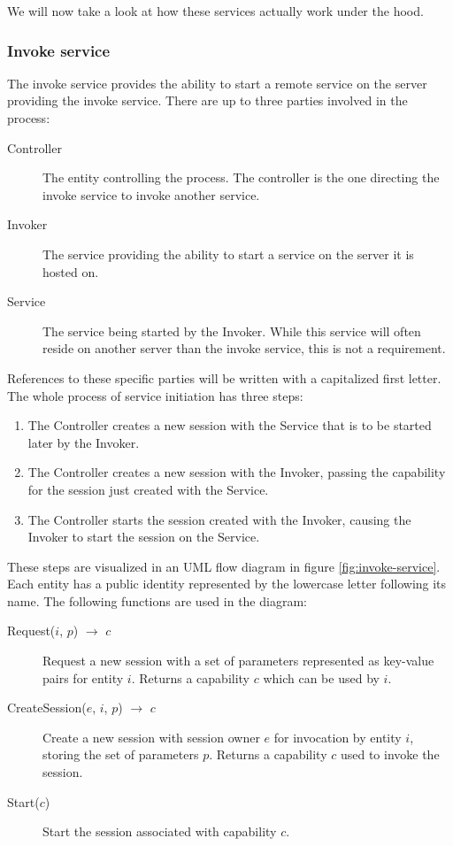 We will now take a look at how these services actually work under the hood.

\subsubsection{Invoke service}
\label{sec:invoke-service}

The invoke service provides the ability to start a remote service on the server providing the invoke service.
There are up to three parties involved in the process:
\begin{description}
    \item[Controller]
        The entity controlling the process.
        The controller is the one directing the invoke service to invoke another service.
    \item[Invoker]
        The service providing the ability to start a service on the server it is hosted on.
    \item[Service]
        The service being started by the Invoker.
        While this service will often reside on another server than the invoke service, this is not a requirement.
\end{description}

References to these specific parties will be written with a capitalized first letter.
The whole process of service initiation has three steps:
\begin{enumerate}
    \item The Controller creates a new session with the Service that is to be started later by the Invoker.
    \item The Controller creates a new session with the Invoker, passing the capability for the session just created with the Service.
    \item The Controller starts the session created with the Invoker, causing the Invoker to start the session on the Service.
\end{enumerate}

These steps are visualized in an UML flow diagram in figure \ref{fig:invoke-service}.
Each entity has a public identity represented by the lowercase letter following its name.
The following functions are used in the diagram:
\begin{description}
    \item[Request($i$, $p$) $\rightarrow$ $c$]
        Request a new session with a set of parameters represented as key-value pairs for entity $i$.
        Returns a capability $c$ which can be used by $i$.
    \item[CreateSession($e$, $i$, $p$) $\rightarrow$ $c$]
        Create a new session with session owner $e$ for invocation by entity $i$, storing the set of parameters $p$.
        Returns a capability $c$ used to invoke the session.
    \item[Start($c$)]
        Start the session associated with capability $c$.
\end{description}

